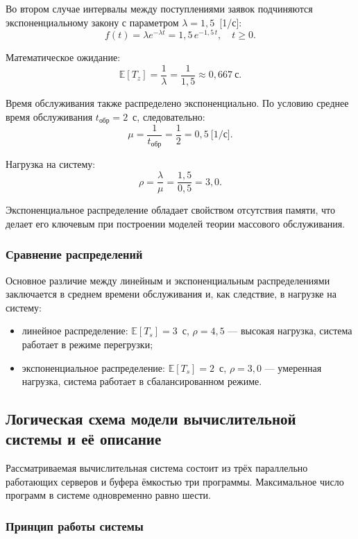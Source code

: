 \documentclass[14pt,a4paper]{extarticle}
\begin{document}
Во втором случае интервалы между поступлениями заявок подчиняются
экспоненциальному закону с параметром $\lambda = 1{,}5$~[1/с]:
\[
  f(t) = \lambda e^{-\lambda t} = 1{,}5\, e^{-1{,}5\, t}, \quad t \geq 0.
\]

Математическое ожидание:
\[
  \mathbb{E}[T_z] = \frac{1}{\lambda} = \frac{1}{1{,}5} \approx 0{,}667\ \text{с}.
\]

Время обслуживания также распределено экспоненциально. По условию среднее время
обслуживания $t_{\text{обр}} = 2$~с, следовательно:
\[
  \mu = \frac{1}{t_{\text{обр}}} = \frac{1}{2} = 0{,}5\ \text{[1/с]}.
\]

Нагрузка на систему:
\[
  \rho = \frac{\lambda}{\mu} = \frac{1{,}5}{0{,}5} = 3{,}0.
\]

Экспоненциальное распределение обладает свойством отсутствия памяти, что делает
его ключевым при построении моделей теории массового обслуживания.

\subsubsection*{Сравнение распределений}

Основное различие между линейным и экспоненциальным распределениями заключается
в среднем времени обслуживания и, как следствие, в нагрузке на систему:
\begin{itemize}
  \item линейное распределение: $\mathbb{E}[T_s] = 3$~с, $\rho = 4{,}5$ ---
        высокая нагрузка, система работает в режиме перегрузки;
  \item экспоненциальное распределение: $\mathbb{E}[T_s] = 2$~с, $\rho = 3{,}0$ ---
        умеренная нагрузка, система работает в сбалансированном режиме.
\end{itemize}

\subsection{Логическая схема модели вычислительной системы и её описание}

Рассматриваемая вычислительная система состоит из трёх параллельно работающих
серверов и буфера ёмкостью три программы. Максимальное число программ в системе
одновременно равно шести.

\subsubsection*{Принцип работы системы}
\end{document}
